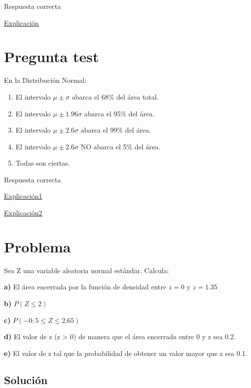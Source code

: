 \documentclass[
]{book}
\providecommand{\tightlist}{%
  \setlength{\itemsep}{0pt}\setlength{\parskip}{0pt}}
\begin{document}
Respuesta correcta

\href{https://1fjmanzano.github.io/bioestadistica/valor-p.html}{Explicación}

\hypertarget{pregunta-test-97}{%
\section{Pregunta test}\label{pregunta-test-97}}

En la Distribución Normal:

\begin{enumerate}
\def\labelenumi{\alph{enumi})}
\tightlist
\item
  El intervalo \(\mu \pm \sigma\) abarca el 68\% del área total.
\item
  El intervalo \(\mu \pm 1.96 \sigma\) abarca el 95\% del área.
\item
  El intervalo \(\mu \pm 2.6\sigma\) abarca el 99\% del área.
\item
  El intervalo \(\mu \pm 2.6\sigma\) NO abarca el 5\% del área.
\item
  Todas son ciertas.
\end{enumerate}

Respuesta correcta

\href{https://1fjmanzano.github.io/bioestadistica/distribuciones-de-probabilidad.html\#distribucio\%CC\%81n-normal}{Explicación1}

\href{https://youtu.be/wWeogWp_bO8}{Explicación2}

\hypertarget{problema-11}{%
\section{Problema}\label{problema-11}}

Sea Z una variable aleatoria normal estándar. Calcula:

\textbf{a)} El área encerrada por la función de densidad entre \(z=0\) y \(z=1.35\)

\textbf{b)} \(P(Z \leq 2)\)

\textbf{c)} \(P(-0:5 \leq Z \leq 2.65)\)

\textbf{d)} El valor de z (z \textgreater{} 0) de manera que el área encerrada entre 0 y z sea 0.2.

\textbf{e)} El valor de z tal que la probabilidad de obtener un valor mayor que z sea 0.1.

\hypertarget{soluciuxf3n-9}{%
\subsection{Solución}\label{soluciuxf3n-9}}
\end{document}
